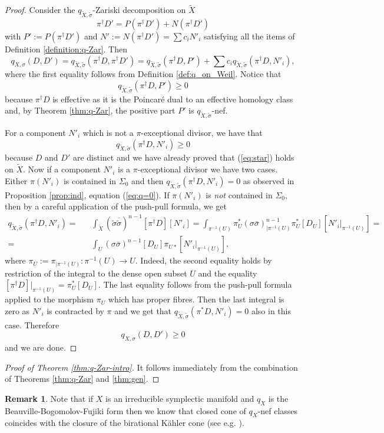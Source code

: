 \documentclass[12pt,reqno]{amsart}
\def\tilde{\widetilde}
\theoremstyle{plain}
\theoremstyle{definition}
\newtheorem{remark}[thm]{Remark}
\begin{document}
\begin{proof}
Consider the $q_{\tilde X, \tilde \sigma}$-Zariski decomposition on $\tilde X$ 
$$
 \pi^{\dagger} D' =P(\pi^{\dagger} D') + N(\pi^{\dagger}D')
$$
with $P':= P(\pi^{\dagger}D')$ and $N':=N(\pi^{\dagger}D')=\sum c_i N'_i$ satisfying all the items of Definition \ref{definition:q-Zar}. 
Then 
$$
 q_{ X, \sigma}(D,D')=q_{\tilde X,\tilde \sigma} (\pi^{\dagger}D, \pi^{\dagger} D')=q_{\tilde X,\tilde \sigma} (\pi^{\dagger}D, P') + \sum c_i q_{\tilde X,\tilde \sigma} (\pi^{\dagger} D,N'_i), 
$$
where the first equality follows from Definition \ref{def:q_on_Weil}. 
Notice that 
$$
 q_{\tilde X,\tilde \sigma} (\pi^{\dagger}D, P')\geq 0
$$
because $\pi^{\dagger}D$ is effective as it is the Poincar\'e dual to an effective homology class and, by Theorem \ref{thm:q-Zar}, the positive part $P'$ is 
$q_{\tilde X,\tilde \sigma}$-nef. 

For a component $N'_i$ which is not a $\pi$-exceptional divisor, we have that $$q_{\tilde X,\tilde \sigma} (\pi^{\dagger} D,N'_i)\geq 0$$ because $D$ and $D'$ are distinct and we have already proved that  (\ref{eq:star}) holds on $\tilde X$. Now if a component $N'_i$ is a $\pi$-exceptional divisor we have two cases. Either $\pi(N'_i)$ is contained in $\Sigma_0$ and then $q_{\tilde X,\tilde \sigma} (\pi^{\dagger}D,N'_i)=0$ as observed in Proposition \ref{prop:ind}, equation (\ref{eq:q=0}).
If $\pi(N'_i)$ is {\it not} contained in $\Sigma_0$,
then by a careful application of the push-pull formula, we get
\begin{eqnarray*}
q_{\tilde X,\tilde \sigma}(\pi^{\dagger}D,N'_i)=&&  \int_{\tilde X} (\tilde\sigma \overline{ \tilde\sigma})^{n-1}[\pi^{\dagger}D] [N'_i] =
 \int_{\pi^{-1}(U)}\pi_U^*(\sigma \bar \sigma)^{n-1}_{|\pi^{-1}(U)} 
 \pi^*_{U}[D_{U}][ N'_i|_{\pi^{-1}(U)}] =
\\  =&&\int_{ U}(\sigma \bar \sigma)^{n-1}[ D_U] \pi_{U*}[N'_i|_{\pi^{-1}(U)}],
\end{eqnarray*}
where $\pi_U:=\pi_{|\pi^{-1}(U)}: \pi^{-1}(U)\to U$. Indeed, the second equality holds by restriction of the integral to the dense open subset $U$ and the equality
$[\pi^{\dagger}D]|_{\pi^{-1}(U)}=\pi_{U}^*[D_{U}]$.  The last equality follows from the push-pull formula applied to the morphism $\pi_U$ which has proper fibres. Then the last integral is zero
as $N'_i$ is contracted by $\pi$ and we get that $q_{\tilde X,\tilde \sigma} (\pi^*D,N'_i)=0$ also in this case.
Therefore
$$
 q_{ X, \sigma}(D,D')\geq 0 
$$
 and we are done.  
  \end{proof}


\begin{proof}[Proof of Theorem \ref{thm:q-Zar-intro}]
It follows immediately from the combination of Theorems \ref{thm:q-Zar} and \ref{thm:gen}.
\end{proof}
\begin{remark}\label{rem nef = closure bir kahler}
Note that if $X$ is an irreducible symplectic manifold and $q_X$ is the Beauville-Bogomolov-Fujiki form then we know that closed cone of $q_X$-nef classes coincides with the closure of the birational K\"ahler cone (see e.g. \cite[Proposition 5.6]{mark_tor}).  
\end{remark}
\end{document}
